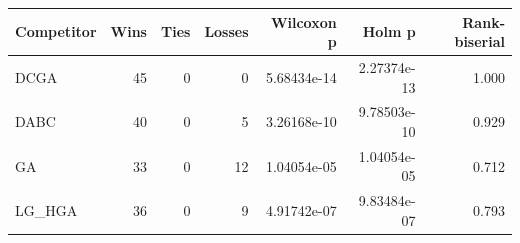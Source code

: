 \begin{tabular}{lrrrrrr}
\toprule
Competitor & Wins & Ties & Losses & Wilcoxon p & Holm p & Rank-biserial \\
\midrule
DCGA & 45 & 0 & 0 & 5.68434e-14 & 2.27374e-13 & 1.000 \\
DABC & 40 & 0 & 5 & 3.26168e-10 & 9.78503e-10 & 0.929 \\
GA & 33 & 0 & 12 & 1.04054e-05 & 1.04054e-05 & 0.712 \\
LG\_HGA & 36 & 0 & 9 & 4.91742e-07 & 9.83484e-07 & 0.793 \\
\bottomrule
\end{tabular}
